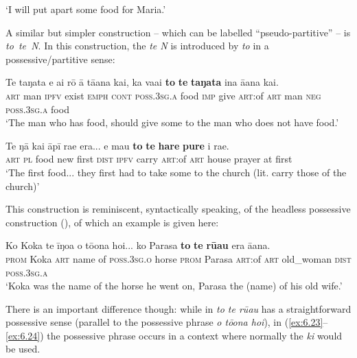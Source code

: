 \glt 
‘I will put apart some food for Maria.’ \textstyleExampleref{[Notes]}
\z

A similar but simpler construction – which can be labelled “pseudo-partitive” – is \textit{to~te~N}. In this construction, the  \textit{te N} is introduced by \textit{to} in a possessive/partitive sense: 

\ea\label{ex:6.23}
\gll Te taŋata e ai rō {\ꞌ}ā tā{\ꞌ}ana kai, ka va{\ꞌ}ai \textbf{to} \textbf{te} \textbf{taŋata}  {\ꞌ}ina {\ꞌ}ā{\ꞌ}ana kai.\\
\textsc{art} man \textsc{ipfv} exist \textsc{emph} \textsc{cont} \textsc{poss.3sg.a} food \textsc{imp} give \textsc{art}:of \textsc{art} man  \textsc{neg} \textsc{poss.3sg.a} food\\

\glt 
‘The man who has food, should give some to the man who does not have food.’ \textstyleExampleref{[Luke 3:11]}
\z

\ea\label{ex:6.24}
\gll Te ŋā kai {\ꞌ}āpī ra{\ꞌ}e era... e ma{\ꞌ}u \textbf{to} \textbf{te} \textbf{hare} \textbf{pure} {\ꞌ}i ra{\ꞌ}e. \\
\textsc{art} \textsc{pl} food new first \textsc{dist} \textsc{ipfv} carry \textsc{art}:of \textsc{art} house prayer at first \\

\glt
‘The first food... they first had to take some to the church (lit. carry those of the church)’ \textstyleExampleref{[R539-3.150]}
\z

This construction is reminiscent, syntactically speaking, of the headless possessive construction (), of which an example is given here: 

\ea\label{ex:6.25}
\gll Ko Koka te {\ꞌ}īŋoa o tō{\ꞌ}ona hoi... ko Parasa  \textbf{to} \textbf{te} \textbf{rū{\ꞌ}au} era {\ꞌ}ā{\ꞌ}ana.\\
\textsc{prom} Koka \textsc{art} name of \textsc{poss.3sg.o} horse \textsc{prom} Parasa  \textsc{art}:of \textsc{art} old\_woman \textsc{dist} \textsc{poss.3sg.a}\\

\glt
‘Koka was the name of the horse he went on, Parasa the (name) of his old wife.’ \textstyleExampleref{[R539-1.420]}
\z

There is an important difference though: while in  \textit{to te rū{\ꞌ}au} has a straightforward possessive sense (parallel to the possessive phrase \textit{o tō{\ꞌ}ona hoi}), in (\ref{ex:6.23}–\ref{ex:6.24}) the possessive phrase occurs in a context where normally the   \textit{ki} would be used.

